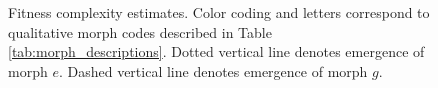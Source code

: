 \begin{figure}


% 
% 

\caption{ Fitness complexity estimates. Color coding and letters correspond to qualitative morph codes described in Table \ref{tab:morph_descriptions}.
Dotted vertical line denotes emergence of morph $e$.
Dashed vertical line denotes emergence of morph $g$.
}
\label{fig:fitness_complexity}

\end{figure}
